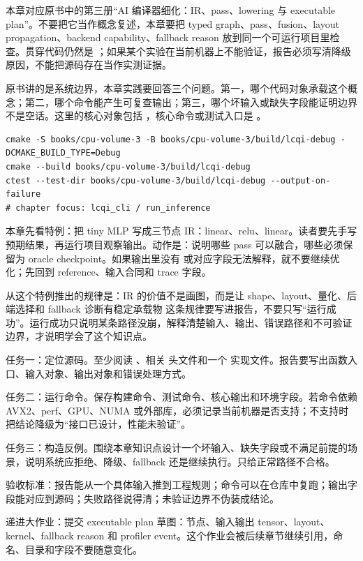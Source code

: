 
本章对应原书中的第三册“AI 编译器细化：IR、pass、lowering 与 executable plan”。不要把它当作概念复述，本章要把 typed graph、pass、fusion、layout propagation、backend capability、fallback reason 放到同一个可运行项目里检查。贯穿代码仍然是 ；如果某个实验在当前机器上不能验证，报告必须写清降级原因，不能把源码存在当作实测证据。


原书讲的是系统边界，本章实践要回答三个问题。第一，哪个代码对象承载这个概念；第二，哪个命令能产生可复查输出；第三，哪个坏输入或缺失字段能证明边界不是空话。这里的核心对象包括 ，核心命令或测试入口是 。

\begin{lstlisting}[numbers=none,caption={第 12 章实践：IR、Pass、Lowering 与 Executable Plan 的最小命令入口}]
cmake -S books/cpu-volume-3 -B books/cpu-volume-3/build/lcqi-debug -DCMAKE_BUILD_TYPE=Debug
cmake --build books/cpu-volume-3/build/lcqi-debug
ctest --test-dir books/cpu-volume-3/build/lcqi-debug --output-on-failure
# chapter focus: lcqi_cli / run_inference
\end{lstlisting}


本章先看特例：把 tiny MLP 写成三节点 IR：linear、relu、linear。读者要先手写预期结果，再运行项目观察输出。动作是：说明哪些 pass 可以融合，哪些必须保留为 oracle checkpoint。如果输出里没有  或对应字段无法解释，就不要继续优化；先回到 reference、输入合同和 trace 字段。

从这个特例推出的规律是：IR 的价值不是画图，而是让 shape、layout、量化、后端选择和 fallback 诊断有稳定承载物 这条规律要写进报告，不要只写“运行成功”。运行成功只说明某条路径没崩，解释清楚输入、输出、错误路径和不可验证边界，才说明学会了这个知识点。


任务一：定位源码。至少阅读 、相关  头文件和一个  实现文件。报告要写出函数入口、输入对象、输出对象和错误处理方式。

任务二：运行命令。保存构建命令、测试命令、核心输出和环境字段。若命令依赖 AVX2、perf、GPU、NUMA 或外部库，必须记录当前机器是否支持；不支持时把结论降级为“接口已设计，性能未验证”。

任务三：构造反例。围绕本章知识点设计一个坏输入、缺失字段或不满足前提的场景，说明系统应拒绝、降级、fallback 还是继续执行。只给正常路径不合格。


验收标准：报告能从一个具体输入推到工程规则；命令可以在仓库中复跑；输出字段能对应到源码；失败路径说得清；未验证边界不伪装成结论。

递进大作业：提交 executable plan 草图：节点、输入输出 tensor、layout、kernel、fallback reason 和 profiler event。这个作业会被后续章节继续引用，命名、目录和字段不要随意变化。

